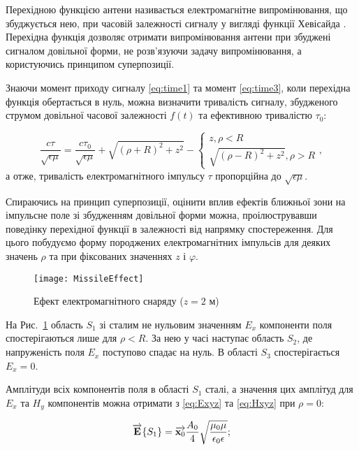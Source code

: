 Перехідною функцією антени називається електромагнітне випромінювання, що 
збуджується нею, при часовій залежності сигналу у вигляді функції Хевісайда
\cite{imp:Kharkevich1950}. Перехідна функція дозволяє отримати 
випромінювання антени при збуджені сигналом довільної форми, не 
розв'язуючи задачу випромінювання, а користуючись принципом суперпозиції.

Знаючи момент приходу сигналу \eqref{eq:time1} та момент \eqref{eq:time3},
коли перехідна функція обертається в нуль, можна визначити тривалість
сигналу, збудженого струмом довільної часової залежності $ f(t) $ та 
ефективною тривалістю $ \tau_0 $:

\begin{equation} \label{eq:e2h}
\frac{c \tau}{\sqrt{\epsilon \mu}} = \frac{c \tau_0}{\sqrt{\epsilon \mu}} + 
\sqrt{(\rho+R)^2 + z^2} - \begin{cases} z, \rho < R \\ 
\sqrt{(\rho-R)^2 + z^2}, \rho > R \end{cases},
\end{equation}
%
а отже, тривалість електромагнітного імпульсу $ \tau $ пропорційна до 
$ \sqrt{\epsilon \mu} $.

Спираючись на принцип суперпозиції, оцінити вплив ефектів ближньої зони на 
імпульсне поле зі збудженням довільної форми можна, проілюструвавши поведінку 
перехідної функції в залежності від напрямку спостереження. Для цього 
побудуємо форму породжених електромагнітних імпульсів для деяких значень 
$ \rho $ та при фіксованих значеннях $ z $ і $ \varphi $.
 
\begin{figure}[h] \begin{center}
\texttt{[image: MissileEffect]}
\caption{Ефект електромагнітного снаряду ($ z = 2 $ м)} \label{fig:emp_rho}
\end{center} \end{figure}

На Рис.~\ref{fig:emp_rho} область $ S_1 $ зі сталим не нульовим значенням 
$ E_x $ компоненти поля спостерігаються лише для $ \rho < R $. За нею у 
часі наступає область $ S_2 $, де напруженість поля $ E_x $ поступово спадає 
на нуль. В області $ S_3 $ спостерігається $ E_x = 0 $.

Амплітуди всіх компонентів поля в області $ S_1 $ сталі, а значення 
цих амплітуд для $ E_x $ та $ H_y $ компонентів можна отримати з 
\eqref{eq:Exyz} та \eqref{eq:Hxyz} при $ \rho = 0 $:

\begin{equation*} \begin{aligned}
\overrightarrow{\mathbf E} \{ S_1 \} = 
\overrightarrow{\mathbf x_0} \frac{A_0}{4} 
\sqrt{\frac{\mu_0 \mu}{\epsilon_0 \epsilon}};
\end{aligned} \end{equation*}

